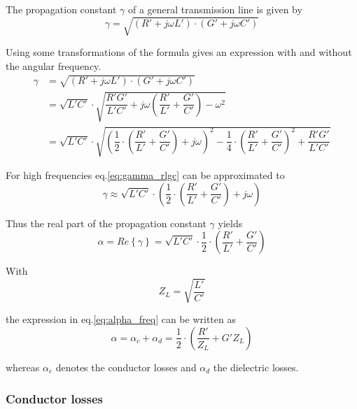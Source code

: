 The propagation constant $\gamma$ of a general transmission line is
given by
\begin{equation}
\gamma = \sqrt{\left(R' + j\omega L'\right)\cdot \left(G' + j\omega C'\right)}
\end{equation}

Using some transformations of the formula gives an expression with and
without the angular frequency.
\begin{equation}
\label{eq:gamma_rlgc}
\begin{split}
\gamma &= \sqrt{\left(R' + j\omega L'\right)\cdot \left(G' + j\omega C'\right)}\\
&= \sqrt{L'C'}\cdot\sqrt{\dfrac{R'G'}{L'C'} + j\omega\left(\dfrac{R'}{L'} + \dfrac{G'}{C'}\right) - \omega^2}\\
&= \sqrt{L'C'}\cdot\sqrt{\left(\dfrac{1}{2}\cdot\left(\dfrac{R'}{L'} + \dfrac{G'}{C'}\right) + j\omega\right)^2 - \dfrac{1}{4}\cdot\left(\dfrac{R'}{L'} + \dfrac{G'}{C'}\right)^2 + \dfrac{R'G'}{L'C'}}
\end{split}
\end{equation}

For high frequencies eq.{\eqref{eq:gamma_rlgc}} can be approximated to
\begin{equation}
\gamma \approx \sqrt{L'C'}\cdot\left(\dfrac{1}{2}\cdot\left(\dfrac{R'}{L'} + \dfrac{G'}{C'}\right) + j\omega\right)
\end{equation}

Thus the real part of the propagation constant $\gamma$ yields
\begin{equation}
\label{eq:alpha_freq}
\alpha = Re\left\{\gamma\right\} = \sqrt{L'C'}\cdot\dfrac{1}{2}\cdot\left(\dfrac{R'}{L'} + \dfrac{G'}{C'}\right)
\end{equation}

With
\begin{equation}
Z_L = \sqrt{\dfrac{L'}{C'}}
\end{equation}

the expression in eq.\eqref{eq:alpha_freq} can be written as
\begin{equation}
\alpha = \alpha_c + \alpha_d = \dfrac{1}{2}\cdot\left(\dfrac{R'}{Z_L} + G'Z_L\right)
\end{equation}

whereas $\alpha_c$ denotes the conductor losses and $\alpha_d$ the
dielectric losses.

\subsubsection{Conductor losses}

